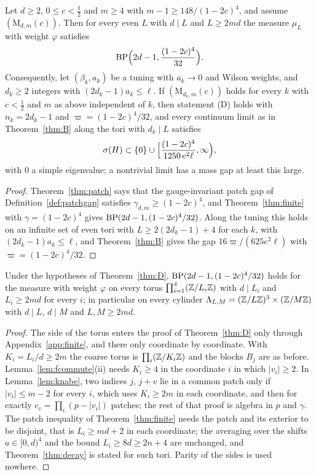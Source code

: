 \begin{mainthm}\label{thm:D}
Let $d\ge2$, $0\le c<\frac12$ and $m\ge4$ with $m-1\ge148/(1-2c)^4$, and
assume $(\mathrm M_{d,m}(c))$. Then for every even $L$ with $d\mid L$ and
$L\ge2md$ the measure $\mu_L$ with weight $\varphi$ satisfies
\[
\mathrm{BP}\Bigl(2d-1,\frac{(1-2c)^4}{32}\Bigr).
\]
Consequently, let $(\beta_k,a_k)$ be a tuning with $a_k\to0$ and Wilson
weights, and $d_k\ge2$ integers with $(2d_k-1)a_k\le\ell$. If
$(\mathrm M_{d_k,m}(c))$ holds for every $k$ with $c<\frac12$ and $m$ as
above independent of $k$, then statement (D) holds with $n_k=2d_k-1$ and
$\varpi=(1-2c)^4/32$, and every continuum limit as in Theorem~\ref{thm:B}
along the tori with $d_k\mid L$ satisfies
\[
\sigma(H)\subset\{0\}\cup\Bigl[\frac{(1-2c)^4}{1250\,e^2\ell},\infty\Bigr),
\]
with $0$ a simple eigenvalue; a nontrivial limit has a mass gap at least
this large.
\end{mainthm}

\begin{proof}
Theorem~\ref{thm:patch} says that the gauge-invariant patch gap of
Definition~\ref{def:patchgap} satisfies $\gamma_{d,m}\ge(1-2c)^4$, and
Theorem~\ref{thm:finite} with $\gamma=(1-2c)^4$ gives
$\mathrm{BP}(2d-1,(1-2c)^4/32)$. Along the tuning this holds on an infinite set of
even tori with $L\ge2(2d_k-1)+4$ for each $k$, with $(2d_k-1)a_k\le\ell$, and
Theorem~\ref{thm:B} gives the gap $16\varpi/(625e^2\ell)$ with
$\varpi=(1-2c)^4/32$.
\end{proof}

\begin{corollary}\label{cor:cylinders}
Under the hypotheses of Theorem~\ref{thm:D}, $\mathrm{BP}(2d-1,(1-2c)^4/32)$ holds
for the measure with weight $\varphi$ on every torus $\prod_{i=1}^4(\mathbb{Z}/L_i\mathbb{Z})$
with $d\mid L_i$ and $L_i\ge2md$ for every $i$; in particular on every
cylinder $\Lambda_{L,M}=(\mathbb{Z}/L\mathbb{Z})^3\times(\mathbb{Z}/M\mathbb{Z})$ with $d\mid L$, $d\mid M$
and $L,M\ge2md$.
\end{corollary}

\begin{proof}
The side of the torus enters the proof of Theorem~\ref{thm:D} only through
Appendix~\ref{app:finite}, and there only coordinate by coordinate. With
$K_i=L_i/d\ge2m$ the coarse torus is $\prod_i(\mathbb{Z}/K_i\mathbb{Z})$ and the blocks
$B_j$ are as before. Lemma~\ref{lem:fcommute}(ii) needs $K_i\ge4$ in the
coordinate $i$ in which $|v_i|\ge2$. In Lemma~\ref{lem:knabe}, two indices
$j$, $j+v$ lie in a common patch only if $|v_i|\le m-2$ for every $i$,
which uses $K_i\ge2m$ in each coordinate, and then for exactly $c_v=
\prod_i(p-|v_i|)$ patches; the rest of that proof is algebra in $p$ and
$\gamma$. The patch inequality of Theorem~\ref{thm:finite} needs the patch
and its exterior to be disjoint, that is $L_i\ge md+2$ in each coordinate;
the averaging over the shifts $a\in[0,d)^4$ and the bound $L_i\ge8d\ge2n+4$
are unchanged, and Theorem~\ref{thm:decay} is stated for such tori. Parity
of the sides is used nowhere.
\end{proof}

